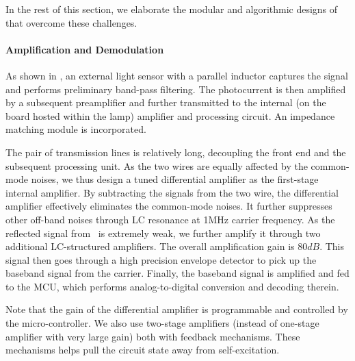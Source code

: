 In the rest of this section, we elaborate the modular and algorithmic designs of \readerrx that overcome these challenges.  


\paragraph{Amplification and Demodulation}
As shown in , an external light sensor with a parallel inductor captures the \vitag signal and performs preliminary band-pass filtering. The photocurrent is then amplified by a subsequent preamplifier and further transmitted to the internal (\ie on the \reader board hosted within the lamp) amplifier and processing circuit. An impedance matching module is incorporated. 

The pair of transmission lines is relatively long, decoupling the front end and the subsequent processing unit.%
As the two wires are equally affected by the common-mode noises, we thus design a tuned differential amplifier as the first-stage internal amplifier. By subtracting the signals from the two wire, the differential amplifier effectively eliminates the common-mode noises. It further suppresses other off-band noises through LC resonance at 1MHz carrier frequency. As the reflected signal from \vitag\ is extremely weak, we further amplify it through two additional LC-structured amplifiers. The overall amplification gain is $80dB$. 
This signal then goes through a high precision envelope detector to pick up the baseband signal from the carrier. 
Finally, the baseband signal is amplified and fed to the MCU, which performs analog-to-digital conversion and decoding therein. 

Note that the gain of the differential amplifier is programmable and controlled by the micro-controller. We also use two-stage amplifiers (instead of one-stage amplifier with very large gain) both with feedback mechanisms. These mechanisms helps pull the circuit state away from self-excitation. 



